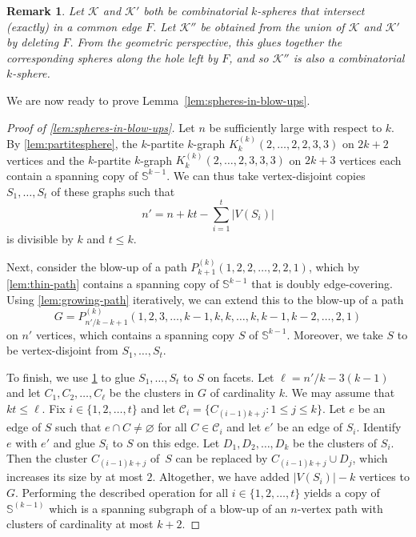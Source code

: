 \documentclass[12pt,reqno]{amsart}
\let\emptyset=\varnothing
\theoremstyle{plain}
\newtheorem{remark}[theorem]{Remark}
\theoremstyle{definition}
\numberwithin{equation}{section}
\newcommand{\cK}{\mathcal{K}}
\newcommand{\bS}{\mathbb{S}}
\begin{document}
	\begin{remark}\label{rmk:gluecommonface}
		Let $\cK$ and $\cK'$ both be combinatorial $k$-spheres that intersect (exactly) in a common edge $F$. Let $\cK''$ be obtained from the union of $\cK$ and $\cK'$ by deleting $F$.
		From the geometric perspective, this glues together the corresponding spheres along the hole left by $F$, and so $\cK''$ is also a combinatorial $k$-sphere.
	\end{remark}
	
	We are now ready to prove Lemma~\ref{lem:spheres-in-blow-ups}.
	
	\begin{proof}[Proof of \cref{lem:spheres-in-blow-ups}]
		Let $n$ be sufficiently large with respect to $k$. By \cref{lem:partitesphere}, the $k$-partite $k$-graph $K_k^{(k)}(2, \dotsc, 2, 2, 3, 3)$ on $2k+2$ vertices and the $k$-partite $k$-graph $K_k^{(k)}(2, \dotsc, 2, 3, 3, 3)$ on $2k+3$ vertices each contain a spanning copy of $\bS^{k - 1}$.
		We can thus take vertex-disjoint copies $S_1,\dots,S_{t}$ of these graphs such that
		\[n' = n+kt-\sum_{i=1}^{t}|V(S_i)|\]    
		is divisible by $k$ and $t \leq k$. 
		
		Next, consider the blow-up of a path $P_{k + 1}^{(k)}(1, 2, 2, \dotsc, 2, 2, 1)$, which by \cref{lem:thin-path} contains a spanning copy of $\bS^{k - 1}$ that is doubly edge-covering.
		Using \cref{lem:growing-path} iteratively, we can extend this to the blow-up of a path \[G = P_{n'/k-k+1}^{(k)}(1, 2, 3, \ldots, k-1, k, k, \ldots, k, k-1, k-2, \ldots, 2, 1)\] on $n'$ vertices, which contains a spanning copy $S$ of $\bS^{k - 1}$.
        Moreover, we take $S$ to be vertex-disjoint from $S_1,\dots,S_t$.
		
		To finish, we use \cref{rmk:gluecommonface} to glue $S_1,\dots,S_t$ to $S$ on facets. Let $\ell = n'/k-3(k-1)$ and let $C_1, C_2, \ldots, C_\ell$ be the clusters in $G$ of cardinality $k$. We may assume that $kt \leq \ell$. Fix $i \in \{1, 2, \ldots, t\}$ and let $\mathcal{C}_i = \{C_{(i-1)k+j} \colon 1 \leq j \leq k\}$. Let $e$ be an edge of $S$ such that $e \cap C \neq \emptyset$ for all $C \in \mathcal{C}_i$ and let $e'$ be an edge of $S_i$. Identify $e$ with $e'$ and glue $S_i$ to $S$ on this edge. Let $D_1, D_2, \ldots, D_k$ be the clusters of $S_i$. Then the cluster $C_{(i-1)k+j}$ of~$S$ can be replaced by $C_{(i-1)k+j} \cup D_j$, which increases its size by at most $2$. Altogether, we have added $|V(S_i)|-k$ vertices to $G$. Performing the described operation for all $i \in \{1, 2, \ldots, t\}$ yields a copy of $\mathbb{S}^{(k-1)}$ which is a spanning subgraph of a blow-up of an $n$-vertex path with clusters of cardinality at most $k+2$.    
	\end{proof}
\end{document}
